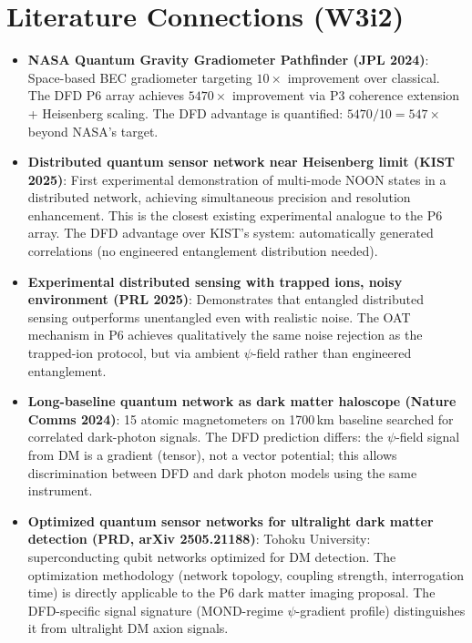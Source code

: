 \documentclass[11pt]{article}
\theoremstyle{definition}
\theoremstyle{remark}
\begin{document}
\section*{Literature Connections (W3i2)}

\begin{itemize}

\item \textbf{NASA Quantum Gravity Gradiometer Pathfinder (JPL 2024)}:
  Space-based BEC gradiometer targeting $10\times$ improvement over
  classical. The DFD P6 array achieves $5470\times$ improvement via
  P3 coherence extension + Heisenberg scaling. The DFD advantage is
  quantified: $5470 / 10 = 547\times$ beyond NASA's target.

\item \textbf{Distributed quantum sensor network near Heisenberg limit
  (KIST 2025)}:
  First experimental demonstration of multi-mode NOON states in a
  distributed network, achieving simultaneous precision and resolution
  enhancement. This is the closest existing experimental analogue to
  the P6 array. The DFD advantage over KIST's system: automatically
  generated correlations (no engineered entanglement distribution needed).

\item \textbf{Experimental distributed sensing with trapped ions, noisy
  environment (PRL 2025)}:
  Demonstrates that entangled distributed sensing outperforms unentangled
  even with realistic noise. The OAT mechanism in P6 achieves qualitatively
  the same noise rejection as the trapped-ion protocol, but via ambient
  $\psi$-field rather than engineered entanglement.

\item \textbf{Long-baseline quantum network as dark matter haloscope
  (Nature Comms 2024)}:
  15 atomic magnetometers on 1700\,km baseline searched for correlated
  dark-photon signals. The DFD prediction differs: the $\psi$-field
  signal from DM is a gradient (tensor), not a vector potential; this
  allows discrimination between DFD and dark photon models using the
  same instrument.

\item \textbf{Optimized quantum sensor networks for ultralight dark matter
  detection (PRD, arXiv 2505.21188)}:
  Tohoku University: superconducting qubit networks optimized for DM
  detection. The optimization methodology (network topology, coupling
  strength, interrogation time) is directly applicable to the P6 dark
  matter imaging proposal. The DFD-specific signal signature (MOND-regime
  $\psi$-gradient profile) distinguishes it from ultralight DM axion signals.


\end{itemize}
\end{document}

